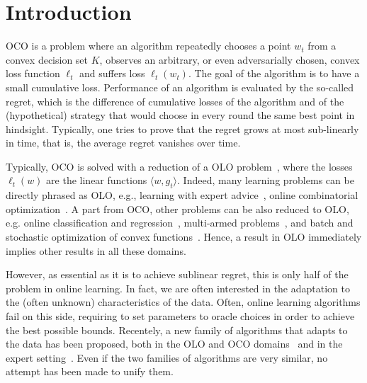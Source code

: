 \section{Introduction}
\ac{OCO} is a problem where an algorithm repeatedly chooses a point $w_t$ from a convex decision set $K$, observes an arbitrary, or even adversarially chosen, convex loss function $\ell_t$ and suffers loss $\ell_t(w_t)$. The goal of the algorithm is to have a small cumulative loss. Performance of an algorithm is evaluated by the so-called regret, which is the difference of cumulative losses of the algorithm and of the (hypothetical) strategy that would choose in every round the same best point in hindsight.
Typically, one tries to prove that the regret grows at most sub-linearly in time, that is, the average regret vanishes over time.

Typically, \ac{OCO} is solved with a reduction of a \ac{OLO} problem~\citep{Cesa-BianchiL06,Shalev-Shwartz12}, where the losses $\ell_t(w)$ are the linear functions $\langle w, g_t\rangle$.
Indeed, many learning problems can be directly phrased as \ac{OLO}, e.g., learning with expert advice~\citep{LittlestoneW94,Vovk98,Cesa-BianchiFHHSW97}, online combinatorial optimization~\cite{KoolenWK10}. A part from \ac{OCO}, other problems can be also reduced to \ac{OLO}, e.g. online classification and regression~\citep[Chapters~11~and~12]{Cesa-BianchiL06}, multi-armed problems~\citep[Chapter~6]{Cesa-BianchiL06}, and batch and stochastic optimization of convex functions~\cite{NemirovskyY83}.  Hence, a result in \ac{OLO} immediately implies other results in all these domains.

However, as essential as it is to achieve sublinear regret, this is only half of the problem in online learning. In fact, we are often interested in the adaptation to the (often unknown) characteristics of the data. Often, online learning algorithms fail on this side, requiring to set parameters to oracle choices in order to achieve the best possible bounds.
Recentely, a new family of algorithms that adapts to the data has been proposed, both in the \ac{OLO} and \ac{OCO} domains~\citep{StreeterM12,Orabona13,McMahanA13,McMahanO14,Orabona14} and in the expert setting~\citep{ChaudhuriYH09,ChernovV10,LuoE14,LuoS15,KoolenE15}. Even if the two families of algorithms are very similar, no attempt has been made to unify them.

